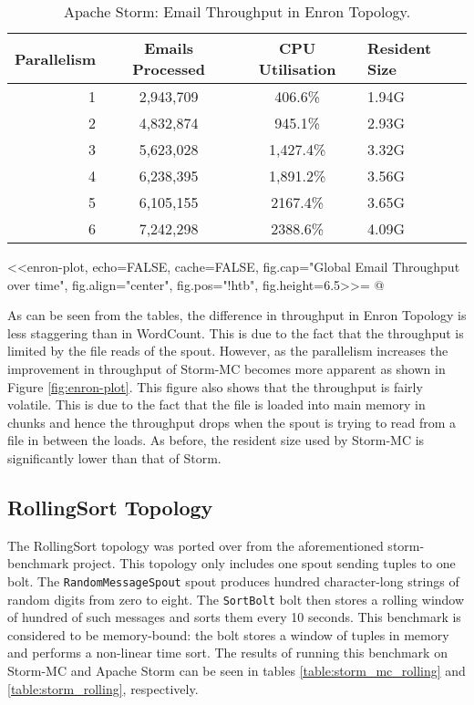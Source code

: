 \begin{table}[!htb]
\begin{adjustwidth}{-0.5in}{-0.5in}
\centering
\small
\begin{tabular}{@{}rccl@{}}
    \textbf{Parallelism} & \textbf{Emails Processed} & \textbf{CPU Utilisation} & \textbf{Resident Size} \\ \toprule
    1 & {2,943,709} & {406.6\%} & {1.94G} \\
    2 & {4,832,874} & {945.1\%} & {2.93G} \\
    3 & {5,623,028} & {1,427.4\%} & {3.32G} \\
    4 & {6,238,395} & {1,891.2\%} & {3.56G} \\
    5 & {6,105,155} & {2167.4\%} & {3.65G} \\
    6 & {7,242,298} & {2388.6\%} & {4.09G} \\
\end{tabular}
\caption{Apache Storm: Email Throughput in Enron Topology.}
\label{table:storm_enron}
\end{adjustwidth}
\end{table}

<<enron-plot, echo=FALSE, cache=FALSE, fig.cap="Global Email Throughput over time", fig.align="center", fig.pos="!htb", fig.height=6.5>>=
@

As can be seen from the tables, the difference in throughput in Enron Topology is less staggering than in WordCount. This is due to the fact that the throughput is limited by the file reads of the spout. However, as the parallelism increases the improvement in throughput of Storm-MC becomes more apparent as shown in Figure \ref{fig:enron-plot}. This figure also shows that the throughput is fairly volatile. This is due to the fact that the file is loaded into main memory in chunks and hence the throughput drops when the spout is trying to read from a file in between the loads. As before, the resident size used by Storm-MC is significantly lower than that of Storm.

\subsection{RollingSort Topology}

The RollingSort topology was ported over from the aforementioned storm-benchmark project. This topology only includes one spout sending tuples to one bolt. The \texttt{RandomMessageSpout} spout produces hundred character-long strings of random digits from zero to eight. The \texttt{SortBolt} bolt then stores a rolling window of hundred of such messages and sorts them every 10 seconds. This benchmark is considered to be memory-bound: the bolt stores a window of tuples in memory and performs a non-linear time sort. The results of running this benchmark on Storm-MC and Apache Storm can be seen in tables \ref{table:storm_mc_rolling} and \ref{table:storm_rolling}, respectively.

